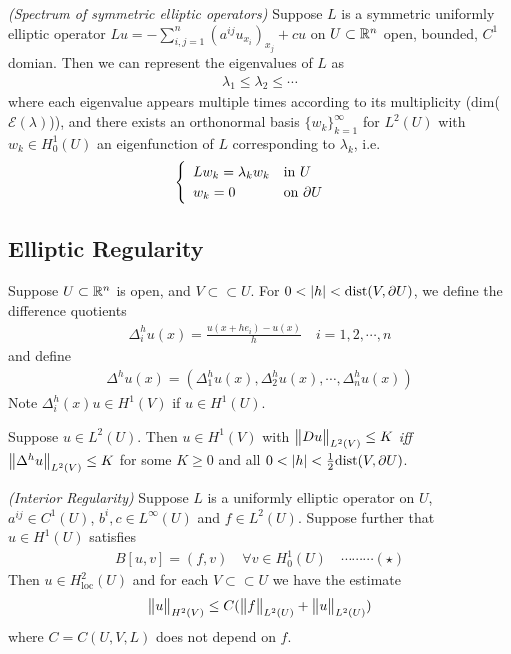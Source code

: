\documentclass[10pt,a4paper]{report}
\begin{document}
\thm \emph{(Spectrum of symmetric elliptic operators)} Suppose $L$ is a symmetric uniformly elliptic operator $Lu = -\sum_{i,j=1}^n (a^{ij}u_{x_i})_{x_j} + cu$ on $U \subset \mathbb{R}^n$ open, bounded, $C^1$ domian. Then we can represent the eigenvalues of $L$ as
\begin{align*}
\lambda_1 \leq \lambda_2 \leq \cdots
\end{align*}
where each eigenvalue appears multiple times according to its multiplicity (dim($\mathscr{E}(\lambda)$)), and there exists an orthonormal basis $\{w_k \}_{k=1}^{\infty}$ for $L^2(U)$ with $w_k \in H_0^1(U)$ an eigenfunction of $L$ corresponding to $\lambda_k$, i.e.
\begin{align*}
\begin{cases}
\begin{array}{ll}
Lw_k = \lambda_k w_k & \text{in } U \\
w_k = 0 & \text{on } \partial U
\end{array}
\end{cases}
\end{align*}

\subsection*{Elliptic Regularity}

Suppose $U\subset \mathbb{R}^n$ is open, and $V \subset \subset U$. For $0< |h| < \text{dist}(V, \partial U)$, we define the difference quotients
\begin{align*}
\Delta_i^h u(x) = \frac{u(x+ he_i) - u(x)}{h} \quad i=1,2,\cdots, n
\end{align*}
and define
\begin{align*}
\Delta^h u(x) = (\Delta_1^h u(x), \Delta_2^h u(x), \cdots, \Delta_n^h u(x))
\end{align*}
Note $\Delta_i^h(x) u \in H^1(V)$ if $u\in H^1(U)$.
\s

\lem Suppose $u \in L^2(U)$. Then $u\in H^1(V)$ with $\bigl\lVert Du\bigr\rVert_{L^2(V)} \leq K$ \emph{iff} $\bigl\lVert\Delta^h u\bigr\rVert_{L^2(V)} \leq K$ for some $K\geq 0$ and all $0< |h|< \frac{1}{2}\text{dist}(V, \partial U)$.
\s

\thm \emph{(Interior Regularity)} Suppose $L$ is a uniformly elliptic operator on $U$, $a^{ij} \in C^1(U)$, $b^i, c\in L^{\infty}(U)$ and $f\in L^2(U)$. Suppose further that $u \in H^1(U)$ satisfies
\begin{align*}
B[u,v] = (f, v) \quad \forall v \in H_0^1(U) \quad \cdots\cdots\cdots (\star)
\end{align*}
Then $u\in H_{\text{loc}}^2(U)$ and for each $V \subset\subset U$ we have the estimate
\begin{align*}
\bigl\lVert u\bigr\rVert_{H^2(V)} \leq C( \bigl\lVert f\bigr\rVert_{L^2(U)} + \bigl\lVert u\bigr\rVert_{L^2(U)}) 
\end{align*}
where $C = C(U,V,L)$ does not depend on $f$.
\s
\end{document}
